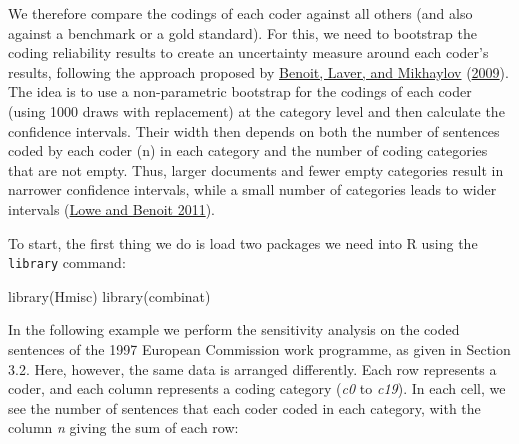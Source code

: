 \documentclass[
]{book}
\newenvironment{Shaded}{\begin{snugshade}}{\end{snugshade}}
\newcommand{\FunctionTok}[1]{\textcolor[rgb]{0.00,0.00,0.00}{#1}}
\newcommand{\NormalTok}[1]{#1}
\begin{document}
We therefore compare the codings of each coder against all others (and also against a benchmark or a gold standard). For this, we need to bootstrap the coding reliability results to create an uncertainty measure around each coder's results, following the approach proposed by \protect\hyperlink{ref-Benoit2009a}{Benoit, Laver, and Mikhaylov} (\protect\hyperlink{ref-Benoit2009a}{2009}). The idea is to use a non-parametric bootstrap for the codings of each coder (using 1000 draws with replacement) at the category level and then calculate the confidence intervals. Their width then depends on both the number of sentences coded by each coder (n) in each category and the number of coding categories that are not empty. Thus, larger documents and fewer empty categories result in narrower confidence intervals, while a small number of categories leads to wider intervals (\protect\hyperlink{ref-Lowe2011a}{Lowe and Benoit 2011}).

To start, the first thing we do is load two packages we need into R using the \texttt{library} command:

\begin{Shaded}
\begin{Highlighting}[]
\FunctionTok{library}\NormalTok{(Hmisc)}
\FunctionTok{library}\NormalTok{(combinat)}
\end{Highlighting}
\end{Shaded}

In the following example we perform the sensitivity analysis on the coded sentences of the 1997 European Commission work programme, as given in Section 3.2. Here, however, the same data is arranged differently. Each row represents a coder, and each column represents a coding category (\emph{c0} to \emph{c19}). In each cell, we see the number of sentences that each coder coded in each category, with the column \emph{n} giving the sum of each row:
\end{document}
